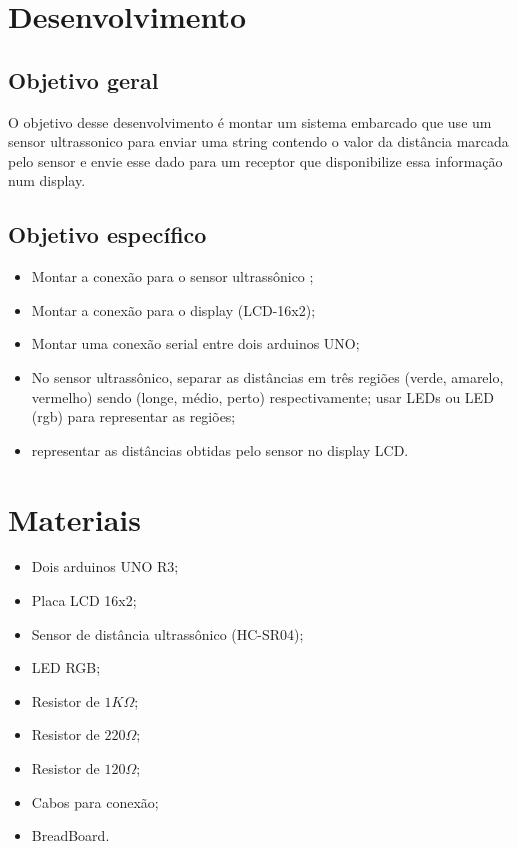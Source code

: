 \documentclass[conference]{IEEEtran}
\begin{document}
\section*{Desenvolvimento}

\subsection{Objetivo geral}
O objetivo desse desenvolvimento é montar um sistema embarcado que use um sensor ultrassonico para enviar uma string
contendo o valor da distância marcada pelo sensor e envie esse dado para um receptor que disponibilize essa informação 
num display.

\subsection{Objetivo específico}
    \begin{itemize}
    \item Montar a conexão para o sensor ultrassônico ;
    \item Montar a conexão para o display (LCD-16x2); 
    \item Montar uma conexão serial entre dois arduinos UNO;
    \item No sensor ultrassônico, separar as distâncias em três regiões (verde, amarelo, vermelho) sendo (longe, médio, perto) respectivamente;
    usar LEDs ou LED (rgb) para representar as regiões;
    \item representar as distâncias obtidas pelo sensor no display LCD.
    \end{itemize}
 
\section{Materiais}
 \begin{itemize}
     \item Dois arduinos UNO R3;
     \item Placa LCD 16x2;
     \item Sensor de distância ultrassônico (HC-SR04);
     \item LED RGB;
     \item Resistor de $ 1K\Omega $;
     \item Resistor de $ 220\Omega $;
     \item Resistor de $ 120\Omega $;
    \item Cabos para conexão;
    \item BreadBoard.
 \end{itemize}
\end{document}

